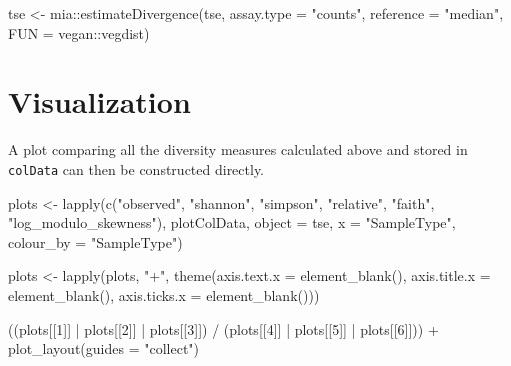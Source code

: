 \documentclass[
]{book}
\newenvironment{Shaded}{\begin{snugshade}}{\end{snugshade}}
\newcommand{\AttributeTok}[1]{\textcolor[rgb]{0.77,0.63,0.00}{#1}}
\newcommand{\DecValTok}[1]{\textcolor[rgb]{0.00,0.00,0.81}{#1}}
\newcommand{\FunctionTok}[1]{\textcolor[rgb]{0.00,0.00,0.00}{#1}}
\newcommand{\NormalTok}[1]{#1}
\newcommand{\OtherTok}[1]{\textcolor[rgb]{0.56,0.35,0.01}{#1}}
\newcommand{\SpecialCharTok}[1]{\textcolor[rgb]{0.00,0.00,0.00}{#1}}
\newcommand{\StringTok}[1]{\textcolor[rgb]{0.31,0.60,0.02}{#1}}
\begin{document}
\begin{Shaded}
\begin{Highlighting}[]
\NormalTok{tse }\OtherTok{\textless{}{-}}\NormalTok{ mia}\SpecialCharTok{::}\FunctionTok{estimateDivergence}\NormalTok{(tse,}
                               \AttributeTok{assay.type =} \StringTok{"counts"}\NormalTok{,}
                               \AttributeTok{reference =} \StringTok{"median"}\NormalTok{,}
                               \AttributeTok{FUN =}\NormalTok{ vegan}\SpecialCharTok{::}\NormalTok{vegdist)}
\end{Highlighting}
\end{Shaded}

\hypertarget{visualization}{%
\section{Visualization}\label{visualization}}

A plot comparing all the diversity measures calculated above and stored in \texttt{colData} can then be constructed directly.

\begin{Shaded}
\begin{Highlighting}[]
\NormalTok{plots }\OtherTok{\textless{}{-}} \FunctionTok{lapply}\NormalTok{(}\FunctionTok{c}\NormalTok{(}\StringTok{"observed"}\NormalTok{, }\StringTok{"shannon"}\NormalTok{, }\StringTok{"simpson"}\NormalTok{, }\StringTok{"relative"}\NormalTok{, }\StringTok{"faith"}\NormalTok{, }\StringTok{"log\_modulo\_skewness"}\NormalTok{),}
\NormalTok{                plotColData,}
                \AttributeTok{object =}\NormalTok{ tse,}
                \AttributeTok{x =} \StringTok{"SampleType"}\NormalTok{,}
                \AttributeTok{colour\_by =} \StringTok{"SampleType"}\NormalTok{)}

\NormalTok{plots }\OtherTok{\textless{}{-}} \FunctionTok{lapply}\NormalTok{(plots, }\StringTok{"+"}\NormalTok{, }
                \FunctionTok{theme}\NormalTok{(}\AttributeTok{axis.text.x =} \FunctionTok{element\_blank}\NormalTok{(),}
                      \AttributeTok{axis.title.x =} \FunctionTok{element\_blank}\NormalTok{(),}
                      \AttributeTok{axis.ticks.x =} \FunctionTok{element\_blank}\NormalTok{()))}

\NormalTok{((plots[[}\DecValTok{1}\NormalTok{]] }\SpecialCharTok{|}\NormalTok{ plots[[}\DecValTok{2}\NormalTok{]] }\SpecialCharTok{|}\NormalTok{ plots[[}\DecValTok{3}\NormalTok{]]) }\SpecialCharTok{/} 
\NormalTok{(plots[[}\DecValTok{4}\NormalTok{]] }\SpecialCharTok{|}\NormalTok{ plots[[}\DecValTok{5}\NormalTok{]] }\SpecialCharTok{|}\NormalTok{ plots[[}\DecValTok{6}\NormalTok{]])) }\SpecialCharTok{+}
  \FunctionTok{plot\_layout}\NormalTok{(}\AttributeTok{guides =} \StringTok{"collect"}\NormalTok{)}
\end{Highlighting}
\end{Shaded}
\end{document}
